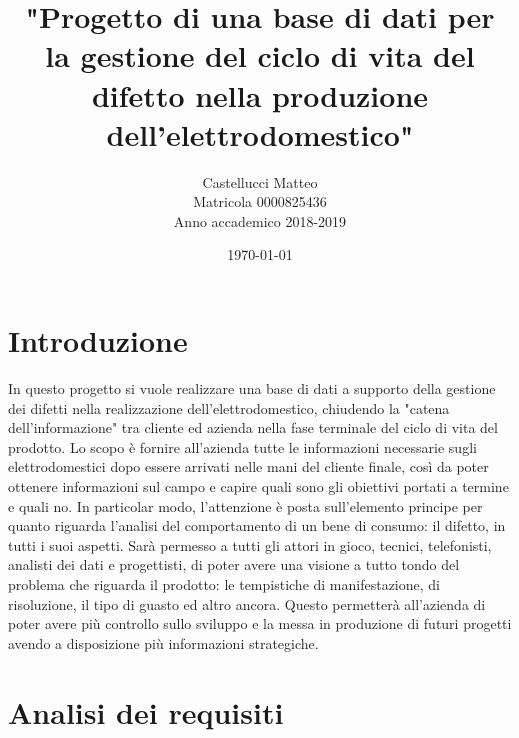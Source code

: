 \documentclass[a4paper, 12pt]{report}
\title{"Progetto di una base di dati per la gestione del ciclo di vita del difetto nella produzione dell'elettrodomestico"}
\author{Castellucci Matteo\\Matricola 0000825436\\Anno accademico 2018-2019}
\date{\today}
\begin{document}
\maketitle

\tableofcontents

\chapter{Introduzione}
In questo progetto si vuole realizzare una base di dati a supporto della gestione dei difetti nella realizzazione dell'elettrodomestico,
chiudendo la "catena dell'informazione" tra cliente ed azienda nella fase terminale del ciclo di vita del prodotto. Lo scopo è fornire
all'azienda tutte le informazioni necessarie sugli elettrodomestici dopo essere arrivati nelle mani del cliente finale, così da poter
ottenere informazioni sul campo e capire quali sono gli obiettivi portati a termine e quali no. In particolar modo, l'attenzione è posta sull'elemento
principe per quanto riguarda l'analisi del comportamento di un bene di consumo: il difetto, in tutti i suoi aspetti. Sarà permesso a tutti gli
attori in gioco, tecnici, telefonisti, analisti dei dati e progettisti, di poter avere una visione a tutto tondo del problema che riguarda
il prodotto: le tempistiche di manifestazione, di risoluzione, il tipo di guasto ed altro ancora. Questo permetterà all'azienda di poter
avere più controllo sullo sviluppo e la messa in produzione di futuri progetti avendo a disposizione più informazioni strategiche.

\chapter{Analisi dei requisiti}
\end{document}
